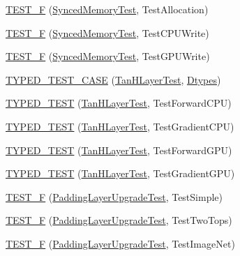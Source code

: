 \begin{DoxyCompactItemize}
\item 
\hyperlink{namespacecaffe_a6a74cb9b157550b7d7b4a4f7f2aad8b5}{T\+E\+S\+T\+\_\+\+F} (\hyperlink{classcaffe_1_1_synced_memory_test}{Synced\+Memory\+Test}, Test\+Allocation)
\item 
\hyperlink{namespacecaffe_af9f1a17b1281df81058b43fa0437e1ac}{T\+E\+S\+T\+\_\+\+F} (\hyperlink{classcaffe_1_1_synced_memory_test}{Synced\+Memory\+Test}, Test\+C\+P\+U\+Write)
\item 
\hyperlink{namespacecaffe_a9c23bca779a67fdc807768568e14553f}{T\+E\+S\+T\+\_\+\+F} (\hyperlink{classcaffe_1_1_synced_memory_test}{Synced\+Memory\+Test}, Test\+G\+P\+U\+Write)
\item 
\hyperlink{namespacecaffe_a1dbe8b12875e04d59ef00e71e9bbebf2}{T\+Y\+P\+E\+D\+\_\+\+T\+E\+S\+T\+\_\+\+C\+A\+S\+E} (\hyperlink{classcaffe_1_1_tan_h_layer_test}{Tan\+H\+Layer\+Test}, \hyperlink{namespacecaffe_a131dc2be50f2f10e18450da61cde6b57}{Dtypes})
\item 
\hyperlink{namespacecaffe_af18a3c17dfa23be1a9e3dc43d12f6196}{T\+Y\+P\+E\+D\+\_\+\+T\+E\+S\+T} (\hyperlink{classcaffe_1_1_tan_h_layer_test}{Tan\+H\+Layer\+Test}, Test\+Forward\+C\+P\+U)
\item 
\hyperlink{namespacecaffe_ae91fc8ae0d621974ea01a9d3a8011626}{T\+Y\+P\+E\+D\+\_\+\+T\+E\+S\+T} (\hyperlink{classcaffe_1_1_tan_h_layer_test}{Tan\+H\+Layer\+Test}, Test\+Gradient\+C\+P\+U)
\item 
\hyperlink{namespacecaffe_a1857148ed94c0ae4e75a271905a12266}{T\+Y\+P\+E\+D\+\_\+\+T\+E\+S\+T} (\hyperlink{classcaffe_1_1_tan_h_layer_test}{Tan\+H\+Layer\+Test}, Test\+Forward\+G\+P\+U)
\item 
\hyperlink{namespacecaffe_ac711a1008a381a5d3fa409037f893761}{T\+Y\+P\+E\+D\+\_\+\+T\+E\+S\+T} (\hyperlink{classcaffe_1_1_tan_h_layer_test}{Tan\+H\+Layer\+Test}, Test\+Gradient\+G\+P\+U)
\item 
\hyperlink{namespacecaffe_a82d2219b95fba52c490ce89cf86b5c80}{T\+E\+S\+T\+\_\+\+F} (\hyperlink{classcaffe_1_1_padding_layer_upgrade_test}{Padding\+Layer\+Upgrade\+Test}, Test\+Simple)
\item 
\hyperlink{namespacecaffe_a9d199f77b7593d009839beb994785212}{T\+E\+S\+T\+\_\+\+F} (\hyperlink{classcaffe_1_1_padding_layer_upgrade_test}{Padding\+Layer\+Upgrade\+Test}, Test\+Two\+Tops)
\item 
\hyperlink{namespacecaffe_a1fb356672a7874007473e432b455899b}{T\+E\+S\+T\+\_\+\+F} (\hyperlink{classcaffe_1_1_padding_layer_upgrade_test}{Padding\+Layer\+Upgrade\+Test}, Test\+Image\+Net)
\item 

\end{DoxyCompactItemize}
